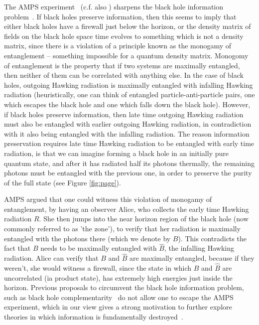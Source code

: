 \documentclass[12pt,a4paper]{article}
\begin{document}
The AMPS experiment~\cite{almheiri2013black} (c.f. also \cite{braunstein2009entangled}) sharpens the black hole information problem~\cite{hawking-bhinfoloss,hawking-unpredictability,preskill-infoloss-note}. If black holes preserve information, then this seems to imply that either black holes have a firewall just below the horizon, or the density matrix of fields on the black hole space time evolves to something which is not a density matrix, since there is a violation of a principle known as the monogamy of entanglement\cite{coffman2000distributed,bennet-monogomy,koashi2004monogamy} -- something impossible for a quantum density matrix. Monogomy of entanglement is the property that if two systems are maximally entangled, then neither of them can be correlated with anything else. In the case of black holes, outgoing Hawking radiation is maximally entangled with infalling Hawking radiation (heuristically, one can think of entangled particle-anti-particle pairs, one which escapes the black hole and one which falls down the black hole). However, if black holes preserve information, then late time outgoing Hawking radiation must also be entangled with earlier outgoing Hawking radiation, in contradiction with it also being entangled with the infalling radiation. The reason information preservation requires late time Hawking radiation to be entangled with early time radiation, is that we can imagine forming a black hole in an initially pure quantum state, and after it has radiated half its photons thermally, the remaining photons must be entangled with the previous one, in order to preserve the purity of the full state (see Figure \ref{fig:page}).

AMPS argued that one could witness this violation of monogamy of entanglement, by having an observer Alice, who collects the early time Hawking radiation $R$. She then jumps into the near horizon region of the black hole (now commonly referred to as 'the zone'), to verify that her radiation is maximally entangled with the photons there (which we denote by $B$). This contradicts the fact that $B$ needs to be maximally entangled with ${\hat B}$, the infalling Hawking radiation. Alice can verify that $B$ and $\hat B$ are maximally entangled, because if they weren't, she would witness a firewall, since the state in which $B$ and $\hat B$ are uncorrelated (ia product state), has extremely high energies just inside the horizon. Previous proposals to circumvent the black hole information problem, such as black hole complementarity~\cite{tHooft-bhcompl,tHooft-bhcompl-string,susskind-bhcompl} do not allow one to escape the AMPS experiment, which in our view gives a strong motivation to further explore theories in which information is fundamentally destroyed~\cite{bps,unruh-wald-onbps,OR-intrinsic,unruh2012decoherence}.
\end{document}
